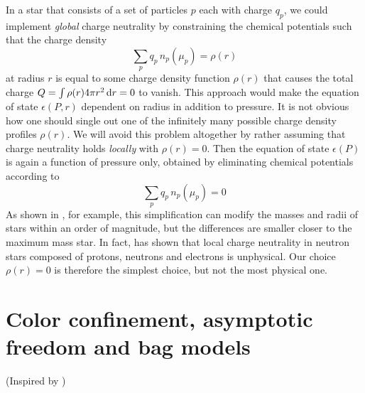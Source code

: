 In a star that consists of a set of particles $p$ each with charge $q_p$, we could implement \emph{global} charge neutrality by constraining the chemical potentials such that the charge density
\begin{equation}
	\sum_p q_p \, n_p(\mu_p) = \rho(r)
\label{eq:intro:charge_neutrality_global}
\end{equation}
at radius $r$ is equal to some charge density function $\rho(r)$ that causes the total charge $Q = \int \rho(r) 4 \pi r^2 \mathop{}\!\mathrm{d} r = 0$  to vanish.
This approach would make the equation of state $\epsilon(P,r)$ dependent on radius in addition to pressure.
It is not obvious how one should single out one of the infinitely many possible charge density profiles $\rho(r)$.
We will avoid this problem altogether by rather assuming that charge neutrality holds \emph{locally} with $\rho(r) = 0$.
Then the equation of state $\epsilon(P)$ is again a function of pressure only, obtained by eliminating chemical potentials according to
\begin{equation}
	\sum_p q_p \, n_p(\mu_p) = 0
\label{eq:lsm:charge_neutrality}
\end{equation}
As shown in \cite{ref:global_neutrality}, for example, this simplification can modify the masses and radii of stars within an order of magnitude, but the differences are smaller closer to the maximum mass star.
In fact, \cite{ref:local_neutrality_inconsistent} has shown that local charge neutrality in neutron stars composed of protons, neutrons and electrons is unphysical.
Our choice $\rho(r)=0$ is therefore the simplest choice, but not the most physical one.

\section{Color confinement, asymptotic freedom and bag models}

(Inspired by \cite{ref:quark_bag_model})


\begin{figure}
\centering
{}
\caption{\label{fig:lsm:confinement}%
}
\end{figure}

